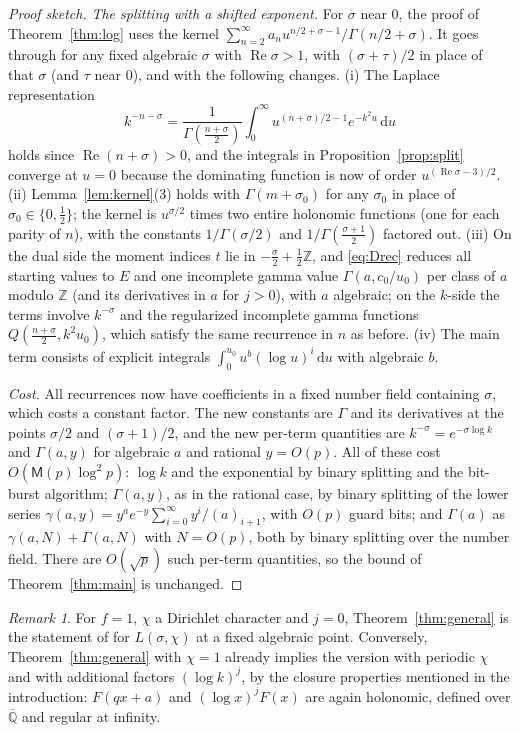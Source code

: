 \documentclass[11pt,reqno]{amsart}
\theoremstyle{definition}
\theoremstyle{remark}
\newtheorem{remark}[theorem]{Remark}
\newcommand{\dd}{\,\mathrm{d}}
\newcommand{\Qbar}{\overline{\mathbb{Q}}}
\newcommand{\ZZ}{\mathbb{Z}}
\newcommand{\Mul}{\mathsf{M}}
\begin{document}
\begin{proof}[Proof sketch]
\emph{The splitting with a shifted exponent.} For $\sigma$ near $0$, the proof of Theorem~\ref{thm:log} uses
the kernel $\sum_{n=2}^{\infty}a_nu^{n/2+\sigma-1}/\Gamma(n/2+\sigma)$. It goes through for any fixed algebraic $\sigma$
with $\operatorname{Re}\sigma > 1$, with $(\sigma+\tau)/2$ in place of that $\sigma$ (and $\tau$ near $0$), and with the
following changes. (i) The Laplace representation
\[
  k^{-n-\sigma} = \frac{1}{\Gamma(\frac{n+\sigma}2)}\int_0^\infty u^{(n+\sigma)/2-1}e^{-k^2u}\dd u
\]
holds since $\operatorname{Re}(n + \sigma) > 0$, and the integrals in Proposition~\ref{prop:split} converge at $u = 0$
because the dominating function is now of order $u^{(\operatorname{Re}\sigma-3)/2}$. (ii) Lemma~\ref{lem:kernel}(3) holds with
$\Gamma(m+\sigma_0)$ for any $\sigma_0$ in place of $\sigma_0 \in \{0, \frac12\}$; the kernel is $u^{\sigma/2}$ times
two entire holonomic functions (one for each parity of $n$), with the constants $1/\Gamma(\sigma/2)$ and
$1/\Gamma(\frac{\sigma+1}2)$ factored out. (iii) On the dual side the moment indices $t$ lie in $-\frac\sigma2 + \frac12\ZZ$, and
\eqref{eq:Drec} reduces all starting values to $E$ and one incomplete gamma value $\Gamma(a, c_0/u_0)$ per class
of $a$ modulo $\ZZ$ (and its derivatives in $a$ for $j > 0$), with $a$ algebraic; on the $k$-side the terms involve
$k^{-\sigma}$ and the regularized incomplete gamma functions $Q(\frac{n+\sigma}{2}, k^2u_0)$, which satisfy the same
recurrence in $n$ as before. (iv) The main term consists of explicit integrals $\int_0^{u_0}u^{b}(\log u)^i\dd u$ with
algebraic $b$.

\emph{Cost.} All recurrences now have coefficients in a fixed number field containing $\sigma$, which costs a
constant factor. The new constants are $\Gamma$ and its derivatives at the points $\sigma/2$ and $(\sigma+1)/2$,
and the new per-term quantities are $k^{-\sigma} = e^{-\sigma\log k}$ and $\Gamma(a, y)$ for algebraic $a$ and
rational $y = O(p)$. All of these cost $O(\Mul(p)\log^2p)$: $\log k$ and the exponential by binary splitting and the
bit-burst algorithm; $\Gamma(a, y)$, as in the rational case, by binary splitting of the lower series
$\gamma(a, y) = y^ae^{-y}\sum_{i=0}^{\infty}y^i/(a)_{i+1}$, with $O(p)$ guard bits; and $\Gamma(a)$ as
$\gamma(a, N) + \Gamma(a, N)$ with $N = O(p)$, both by binary splitting over the number field. There are
$O(\sqrt p)$ such per-term quantities, so the bound of Theorem~\ref{thm:main} is unchanged.
\end{proof}

\begin{remark}
For $f = 1$, $\chi$ a Dirichlet character and $j = 0$, Theorem~\ref{thm:general} is the statement of \cite{Joh21} for
$L(\sigma, \chi)$ at a fixed algebraic point. Conversely, Theorem~\ref{thm:general} with $\chi = 1$ already implies the
version with periodic $\chi$ and with additional factors $(\log k)^j$, by the closure properties mentioned in the
introduction: $F(qx+a)$ and $(\log x)^jF(x)$ are again holonomic, defined over $\Qbar$ and regular at infinity.
\end{remark}
\end{document}
